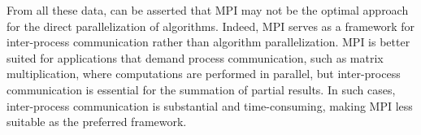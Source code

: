 From all these data, can be asserted that MPI may not be the optimal approach for the direct parallelization of algorithms. %
Indeed, MPI serves as a framework for inter-process communication rather than algorithm parallelization. MPI is better suited %
for applications that demand process communication, such as matrix multiplication, where computations are performed in parallel, %
but inter-process communication is essential for the summation of partial results. In such cases, inter-process communication %
is substantial and time-consuming, making MPI less suitable as the preferred framework.







